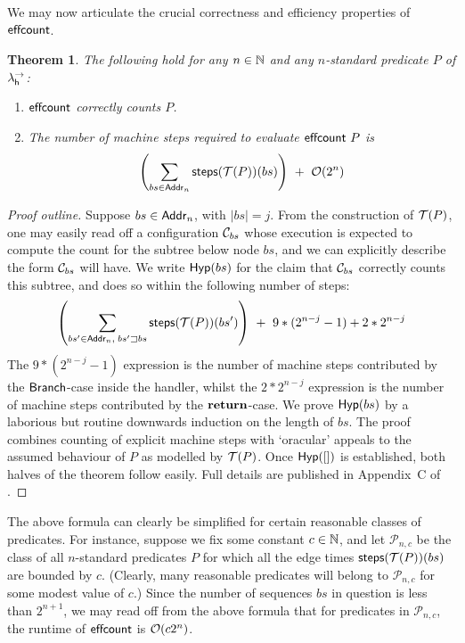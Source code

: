 \documentclass[12pt,phd,lfcs,twoside,openright,logo,leftchapter,normalheadings]{infthesis}
\theoremstyle{plain}
\newtheorem{theorem}{Theorem}[chapter]
\theoremstyle{definition}
\begin{document}
We may now articulate the crucial correctness and efficiency
properties of $\mathsf{effcount}$.

\begin{theorem}\label{thm:complexity-effectful-counting}
  The following hold for any $n \in \mathbb{N}$ and any $n$-standard predicate $P$ of $\lambda^\rightarrow_{\mathsf{h}}$:
  \begin{enumerate}
  \item $\mathsf{effcount}$ correctly counts $P$.
  \item The number of machine steps required to evaluate $\mathsf{effcount}~P$ is
{
  \[
     \left( \displaystyle\sum_{bs \in \mathsf{Addr}_n} \mathsf{steps}(\mathcal{T}(P))(bs) \right) ~+~ \mathcal{O}(2^n)
  \]}%
\end{enumerate}
\end{theorem}
%
\begin{proof}[Proof outline]
  Suppose $bs \in \mathsf{Addr}_n$, with $|bs|=j$.  From the construction of
  $\mathcal{T}(P)$, one may easily read off a configuration $\mathcal{C}_{bs}$ whose
  execution is expected to compute the count for the subtree below
  node $bs$, and we can explicitly describe the form $\mathcal{C}_{bs}$ will
  have.  We write $\mathsf{Hyp}(bs)$ for the claim that $\mathcal{C}_{bs}$
  correctly counts this subtree, and does so within the following
  number of steps: {\small
  \[
     \left( \displaystyle\sum_{bs' \in \mathsf{Addr}_n,\; bs' \sqsupset bs} \mathsf{steps}(\mathcal{T}(P))(bs') \right) ~+~ 9 * (2^{n-j} - 1) + 2*2^{n-j}
  \]
}%
%
The $9*(2^{n-j}-1)$ expression is the number of machine steps
contributed by the $\mathsf{Branch}$-case inside the handler, whilst the
$2*2^{n-j}$ expression is the number of machine steps contributed by
the $\mathbf{return}$-case.
%
We prove $\mathsf{Hyp}(bs)$ by a laborious but routine downwards
induction on the length of $bs$. The proof combines counting of
explicit machine steps with `oracular' appeals to the assumed
behaviour of $P$ as modelled by $\mathcal{T}(P)$. Once
$\mathsf{Hyp}([])$ is established, both halves of the theorem
follow easily.
%
Full details are published in Appendix~C of \citet{HillerstromLL20a}.
\end{proof}
%

The above formula can clearly be simplified for certain reasonable
classes of predicates. For instance, suppose we fix some constant
$c \in \mathbb{N}$, and let $\mathcal{P}_{n,c}$ be the class of all
$n$-standard predicates $P$ for which all the edge times
$\mathsf{steps}(\mathcal{T}(P))(bs)$ are bounded by $c$. (Clearly, many reasonable
predicates will belong to $\mathcal{P}_{n,c}$ for some modest value of
$c$.) Since the number of sequences $bs$ in question is less than
$2^{n+1}$, we may read off from the above formula that for predicates
in $\mathcal{P}_{n,c}$, the runtime of $\mathsf{effcount}$ is $\mathcal{O}(c2^n)$.
\end{document}

